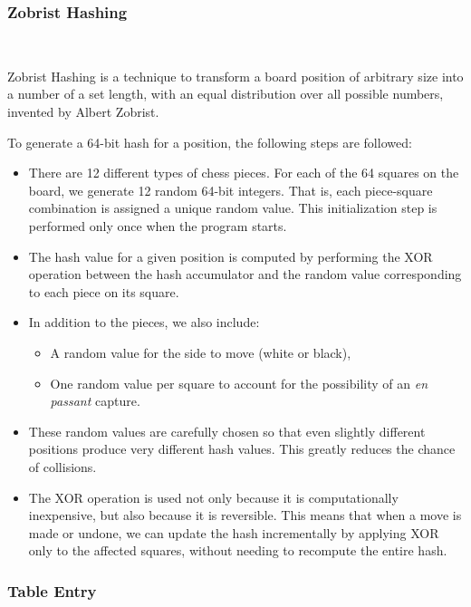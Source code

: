 \subsubsection{Zobrist Hashing}

~\cite{ZobristHashing}

Zobrist Hashing is a technique to transform a board position of arbitrary size into a number of a set length, with an equal distribution over all possible numbers, invented by Albert Zobrist.

\vspace{1em}

\noindent To generate a 64-bit hash for a position, the following steps are followed:

\begin{itemize}
  \item There are 12 different types of chess pieces. For each of the 64 squares on the board, we generate 12 random 64-bit integers. That is, each piece-square combination is assigned a unique random value. This initialization step is performed only once when the program starts.
  \item The hash value for a given position is computed by performing the XOR operation between the hash accumulator and the random value corresponding to each piece on its square.
  \item In addition to the pieces, we also include:
  \begin{itemize}
    \item A random value for the side to move (white or black),
    \item One random value per square to account for the possibility of an \textit{en passant} capture.
  \end{itemize}
  \item These random values are carefully chosen so that even slightly different positions produce very different hash values. This greatly reduces the chance of collisions.
  \item The XOR operation is used not only because it is computationally inexpensive, but also because it is reversible. This means that when a move is made or undone, we can update the hash incrementally by applying XOR only to the affected squares, without needing to recompute the entire hash.
\end{itemize}

\subsubsection{Table Entry}

